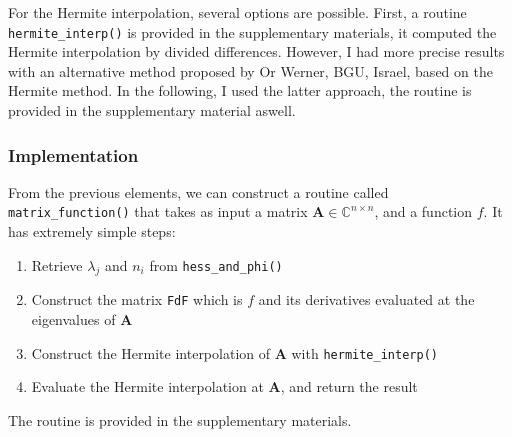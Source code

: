 \documentclass[11pt]{article}
\begin{document}
For the Hermite interpolation, several options are possible. First, a routine \texttt{hermite\_interp()} is provided in the supplementary materials, it computed the Hermite interpolation by divided differences. However, I had more precise results with an alternative method proposed by Or Werner, BGU, Israel, based on the Hermite method. In the following, I used the latter approach, the routine is provided in the supplementary material aswell.
\subsubsection{Implementation}
From the previous elements, we can construct a routine called \texttt{matrix\_function()} that takes as input a matrix $\mathbf{A}\in\mathbb{C}^{n\times n}$, and a function $f$. It has extremely simple steps:
\begin{enumerate}
    \item Retrieve $\lambda_j$ and $n_i$ from \texttt{hess\_and\_phi()}
    \item Construct the matrix \texttt{FdF} which is $f$ and its derivatives evaluated at the eigenvalues of $\mathbf{A}$
    \item Construct the Hermite interpolation of $\mathbf{A}$ with \texttt{hermite\_interp()}
    \item Evaluate the Hermite interpolation at $\mathbf{A}$, and return the result
\end{enumerate}
The routine is provided in the supplementary materials.
\end{document}
